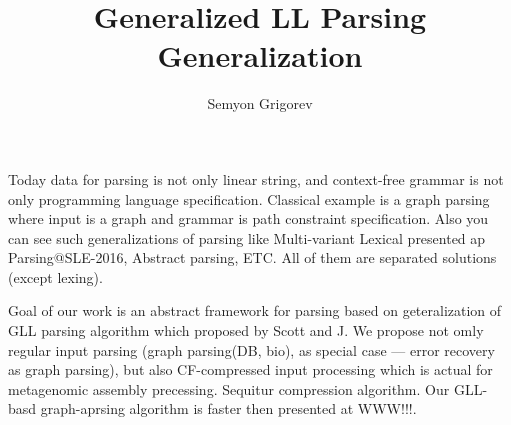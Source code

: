 \documentclass[12pt]{article}  %
\title{Generalized LL Parsing Generalization}
\author{Semyon Grigorev}
\theoremstyle{definition}
\theoremstyle{remark}
\begin{document}
\maketitle

Today data for parsing is not only linear string, and context-free grammar is not only programming language specification.
Classical example is a graph parsing where input is a graph and grammar is path constraint specification.
Also you can see such generalizations of parsing like Multi-variant Lexical presented ap Parsing@SLE-2016, Abstract parsing, ETC.
All of them are separated solutions (except lexing).

Goal of our work is an abstract framework for parsing based on geteralization of GLL parsing algorithm which proposed by Scott and J.
We propose not omly regular input parsing (graph parsing(DB, bio), as special case --- error recovery as graph parsing), but also CF-compressed input processing which is actual for metagenomic assembly precessing. 
Sequitur compression algorithm. 
Our GLL-basd graph-aprsing algorithm is faster then presented at WWW!!!.  
\end{document}

